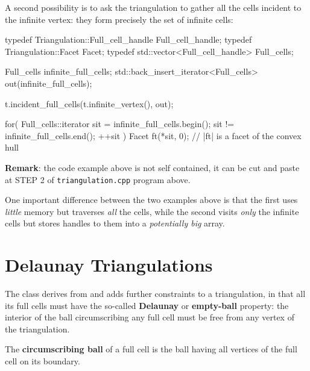 A second possibility is to ask the triangulation to gather all the cells
incident to the infinite vertex: they form precisely the set of infinite
cells:

\begin{ccExampleCode}
typedef Triangulation::Full_cell_handle Full_cell_handle;
typedef Triangulation::Facet Facet;
typedef std::vector<Full_cell_handle> Full_cells;

Full_cells infinite_full_cells;
std::back_insert_iterator<Full_cells> out(infinite_full_cells);

t.incident_full_cells(t.infinite_vertex(), out);

for( Full_cells::iterator sit = infinite_full_cells.begin(); 
       sit != infinite_full_cells.end(); ++sit ) {
    Facet ft(*sit, 0); // |ft| is a facet of the convex hull
}
\end{ccExampleCode}
\textbf{Remark}: the code example above is not self contained, it can
be cut and paste at STEP 2 of {\tt triangulation.cpp} program above.

One important difference between the two examples above is that the first uses
\emph{little} memory but traverses \emph{all} the cells, while the second
visits \emph{only} the infinite cells but stores handles to them into a
\emph{potentially big} array.


\section{Delaunay Triangulations}%

The class  derives from
 and adds further constraints to a
triangulation, in that all its full cells must have the so-called
\textbf{Delaunay} or \textbf{empty-ball} property: the interior of the ball
circumscribing any full cell must be free from any vertex
of the triangulation.

The \textbf{circumscribing ball} of a full cell  is the ball
having all vertices of the full cell on its boundary.

